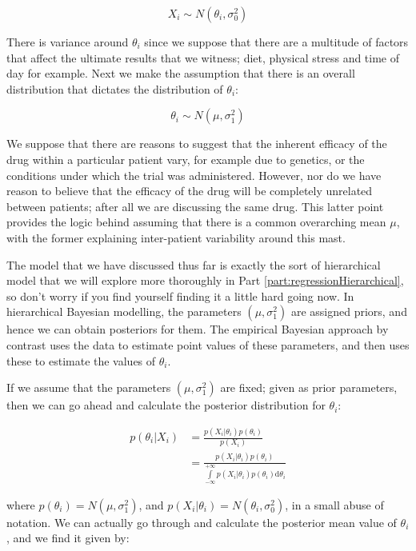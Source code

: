\documentclass[11pt,fullpage]{book}
\begin{document}
\begin{equation}
X_i \sim N(\theta_i,\sigma_0^2)
\end{equation} 

There is variance around $\theta_i$ since we suppose that there are a multitude of factors that affect the ultimate results that we witness; diet, physical stress and time of day for example. Next we make the assumption that there is an overall distribution that dictates the distribution of $\theta_i$:

\begin{equation}
\theta_i \sim N(\mu,\sigma_1^2)
\end{equation}

We suppose that there are reasons to suggest that the inherent efficacy of the drug within a particular patient vary, for example due to genetics, or the conditions under which the trial was administered. However, nor do we have reason to believe that the efficacy of the drug will be completely unrelated between patients; after all we are discussing the same drug. This latter point provides the logic behind assuming that there is a common overarching mean $\mu$, with the former explaining inter-patient variability around this mast. 

The model that we have discussed thus far is exactly the sort of hierarchical model that we will explore more thoroughly in Part \ref{part:regressionHierarchical}, so don't worry if you find yourself finding it a little hard going now. In hierarchical Bayesian modelling, the parameters $(\mu,\sigma_1^2)$ are assigned priors, and hence we can obtain posteriors for them. The empirical Bayesian approach by contrast uses the data to estimate point values of these parameters, and then uses these to estimate the values of $\theta_i$. 

If we assume that the parameters $(\mu,\sigma_1^2)$ are fixed; given as prior parameters, then we can go ahead and calculate the posterior distribution for $\theta_i$:

\begin{equation}\label{eq:Objective_empiricalBayes}
\begin{align}
p(\theta_i|X_i) &= \frac{p(X_i|\theta_i) p(\theta_i)}{p(X_i)}\\
&= \frac{p(X_i|\theta_i) p(\theta_i)}{\int\limits_{-\infty}^{+\infty}p(X_i|\theta_i) p(\theta_i)\mathrm{d}\theta_i}
\end{align}
\end{equation}

where $p(\theta_i)=N(\mu,\sigma_1^2)$, and $p(X_i|\theta_i)=N(\theta_i,\sigma_0^2)$, in a small abuse of notation. We can actually go through and calculate the posterior mean value of $\theta_i$, and we find it given by:
\end{document}
